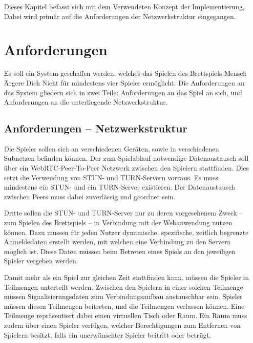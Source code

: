 Dieses Kapitel befasst sich mit dem Verwendeten Konzept der Implementierung, Dabei wird primär auf die Anforderungen der Netzwerkstruktur eingegangen.

\section{Anforderungen}
Es soll ein System geschaffen werden, welches das Spielen des Brettspiels \glqq{}Mensch Ärgere Dich Nicht\grqq{} für mindestens vier Spieler ermöglicht. Die Anforderungen an das System gliedern sich in zwei Teile: Anforderungen an das Spiel an sich, und Anforderungen an die unterliegende Netzwerkstruktur.\par

\subsection{Anforderungen -- Netzwerkstruktur}
Die Spieler sollen sich an verschiedenen Geräten, sowie in verschiedenen Subnetzen befinden können. Der zum Spielablauf notwendige Datenaustausch soll über ein \acs{WebRTC}-Peer-To-Peer Netzwerk zwischen den Spielern stattfinden. Dies setzt die Verwendung von STUN- und TURN-Servern vorraus. Es muss mindestens ein STUN- und ein TURN-Server existieren. Der Datenaustausch zwischen Peers muss dabei zuverlässig und geordnet sein.\par

Dritte sollen die STUN- und TURN-Server nur zu deren vorgesehenem Zweck -- zum Spielen des Brettspiels -- in Verbindung mit der Webanwendung nutzen können. Dazu müssen für jeden Nutzer dynamische, spezifische, zeitlich begrenzte Anmeldedaten erstellt werden, mit welchen eine Verbindung zu den Servern möglich ist. Diese Daten müssen beim Betreten eines Spiels an den jeweiligen Spieler vergeben werden.\par

\label{section:weitere}
Damit mehr als ein Spiel zur gleichen Zeit stattfinden kann, müssen die Spieler in Teilmengen unterteilt werden. Zwischen den Spielern in einer solchen Teilmenge müssen Signalisierungsdaten zum Verbindungsaufbau austauschbar sein. Spieler müssen diesen Teilmengen beitreten, und die Teilmengen verlassen können. Eine Teilmenge repräsentiert dabei einen virtuellen \glqq{}Tisch\grqq{} oder \glqq{}Raum\grqq{}. Ein \glqq{}Raum\grqq{} muss zudem über einen Spieler verfügen, welcher Berechtigungen zum Entfernen von Spielern besitzt, falls ein unerwünschter Spieler beitritt oder betrügt.\par

